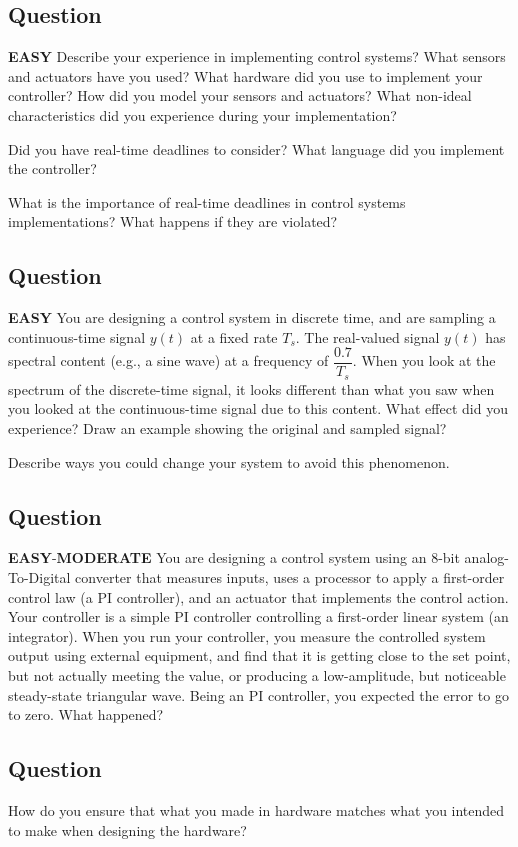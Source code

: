 \documentclass{article}
\newcommand{\RatingBase}[2]{\textcolor{#1}{{\fontfamily{phv}\selectfont\textbf{#2}}}}
\newcommand{\Easy}{\RatingBase{green!50!black!50}{EASY}}
\newcommand{\Moderate}{\RatingBase{yellow!50!black!50}{MODERATE}}
\begin{document}
\subsection{Question}
\Easy{} Describe your experience in implementing control systems?  What sensors and actuators have you used?  What hardware did you use to implement your controller?  How did you model your sensors and actuators?  What non-ideal characteristics did you experience during your implementation?  

Did you have real-time deadlines to consider?  What language did you implement the controller?

What is the importance of real-time deadlines in control systems implementations?  What happens if they are violated?



\subsection{Question}
\Easy{} You are designing a control system in discrete time, and are sampling a continuous-time signal $y(t)$ at a fixed rate $T_s$.  The real-valued signal $y(t)$ has spectral content (e.g., a sine wave) at  a frequency of $\dfrac{0.7}{T_s}$.  When you look at the spectrum of the discrete-time signal, it  looks different than what you saw when you looked at the continuous-time signal due to this content.  What effect did you experience?   Draw an example showing the original and sampled signal?

Describe ways you could change your system to avoid this phenomenon.

\subsection{Question}
\Easy{}-\Moderate{} You are designing a control system using an 8-bit analog-To-Digital converter that measures inputs, uses a processor to apply a first-order control law (a PI controller), and an actuator that implements the control action.  Your controller is a simple PI controller controlling a first-order linear system (an integrator).  When you run your controller, you measure the controlled system output using external equipment, and find that it is getting close to the set point, but not actually meeting the value, or producing a low-amplitude, but noticeable steady-state triangular wave.  Being an PI controller, you expected the error to go to zero.  What happened?

\subsection{Question}
How do you ensure that what you made in hardware matches what you intended to make when designing the hardware?
\end{document}
